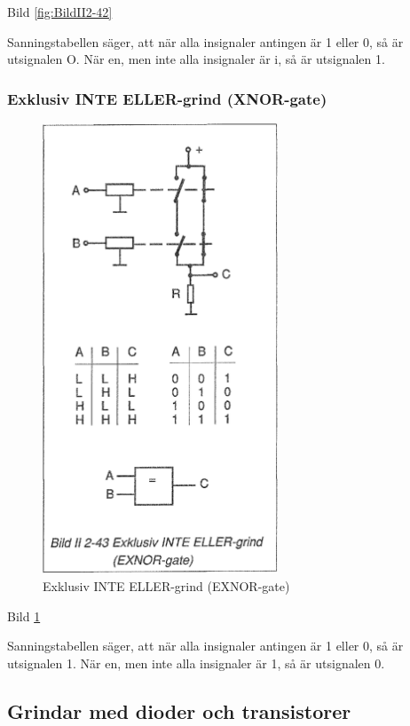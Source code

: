 Bild \ref{fig:BildII2-42}

Sanningstabellen säger, att när alla insignaler antingen är 1 eller 0, så är
utsignalen O. När en, men inte alla insignaler är i, så är utsignalen 1.

\subsubsection{Exklusiv INTE ELLER-grind (XNOR-gate)}

\begin{figure}[h]
\begin{center}
\includegraphics[width=7cm]{images/bild_2_2-43}
\caption{Exklusiv INTE ELLER-grind (EXNOR-gate)}
\label{fig:BildII2-43}
\end{center}
\end{figure}

Bild \ref{fig:BildII2-43}

Sanningstabellen säger, att när alla insignaler antingen är 1 eller 0, så är
utsignalen 1. När en, men inte alla insignaler är 1, så är utsignalen 0.

\subsection{Grindar med dioder och transistorer}

